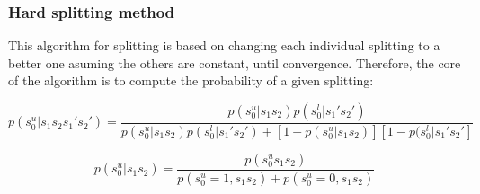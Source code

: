 \documentclass[a4paper,12pt]{article}
\begin{document}
\subsubsection{Hard splitting method}
This algorithm for splitting is based on changing each individual splitting to a better one asuming the others are constant, until convergence. Therefore, the core of the algorithm is to compute the probability of a given splitting:

\begin{equation}
p(s_0^u|s_1s_2s_1's_2')=\frac{p(s_0^u|s_1s_2)p(s_0^l|s_1's_2')}{p(s_0^u|s_1s_2)p(s_0^l|s_1's_2')+[1-p(s_0^u|s_1s_2)][1-p(s_0^l|s_1's_2']}
\end{equation}


\begin{equation}
p(s_0^u|s_1s_2)=\frac{p(s_0^us_1s_2)}{p(s_0^u=1,s_1s_2)+p(s_0^u=0,s_1s_2)}
\end{equation}





%




\end{document}
